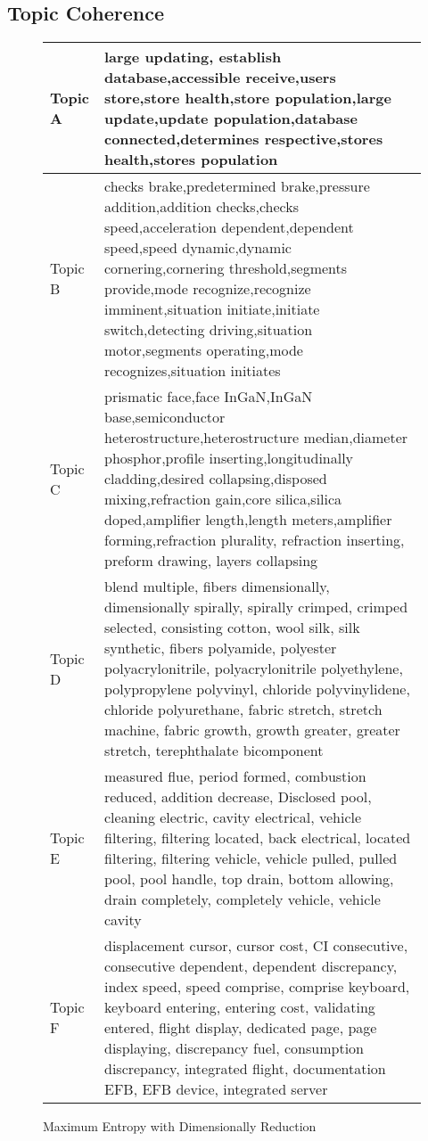 \subsection{Topic Coherence}
\begin{figure}[!h]
\begin{center}
\caption{Maximum Entropy with Dimensionally Reduction}
\begin{tabular}{|l l|}
\hline

Topic A  &	large updating, establish database,accessible receive,users store,store health,store population,large update,update population,database connected,determines respective,stores health,stores population\\ \hline
Topic B  &	checks brake,predetermined brake,pressure addition,addition checks,checks speed,acceleration dependent,dependent speed,speed dynamic,dynamic cornering,cornering threshold,segments provide,mode recognize,recognize imminent,situation initiate,initiate switch,detecting driving,situation motor,segments operating,mode recognizes,situation initiates\\ \hline	
Topic C  & prismatic face,face InGaN,InGaN base,semiconductor heterostructure,heterostructure median,diameter phosphor,profile inserting,longitudinally cladding,desired collapsing,disposed mixing,refraction gain,core silica,silica doped,amplifier length,length meters,amplifier forming,refraction plurality, refraction inserting, preform drawing, layers collapsing\\ \hline
Topic D  & blend multiple, fibers dimensionally, dimensionally spirally, spirally crimped, crimped selected, consisting cotton, wool silk, silk synthetic, fibers polyamide, polyester polyacrylonitrile, polyacrylonitrile polyethylene, polypropylene polyvinyl, chloride polyvinylidene, chloride polyurethane, fabric stretch, stretch machine, fabric growth, growth greater, greater stretch, terephthalate bicomponent\\\hline
Topic E  & measured flue, period formed, combustion reduced, addition decrease, Disclosed pool, cleaning electric, cavity electrical, vehicle filtering, filtering located, back electrical, located filtering, filtering vehicle, vehicle pulled, pulled pool, pool handle, top drain, bottom allowing, drain completely, completely vehicle, vehicle cavity\\ \hline 
Topic F  & displacement cursor, cursor cost, CI consecutive, consecutive dependent, dependent discrepancy, index speed, speed comprise, comprise keyboard, keyboard entering, entering cost, validating entered, flight display, dedicated page, page displaying, discrepancy fuel, consumption discrepancy, integrated flight, documentation EFB, EFB device, integrated server\\ \hline 

\end{tabular}
\end{center}
\end{figure}
